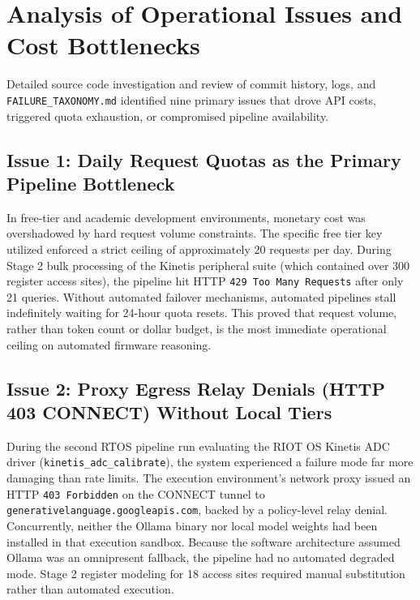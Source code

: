 \documentclass[11pt,a4paper]{article}
\begin{document}
\section{Analysis of Operational Issues and Cost Bottlenecks}

Detailed source code investigation and review of commit history, logs, and \texttt{FAILURE\_TAXONOMY.md} identified nine primary issues that drove API costs, triggered quota exhaustion, or compromised pipeline availability.

\subsection{Issue 1: Daily Request Quotas as the Primary Pipeline Bottleneck}
In free-tier and academic development environments, monetary cost was overshadowed by hard request volume constraints. The specific free tier key utilized enforced a strict ceiling of approximately 20 requests per day. During Stage 2 bulk processing of the Kinetis peripheral suite (which contained over 300 register access sites), the pipeline hit HTTP \texttt{429 Too Many Requests} after only 21 queries. Without automated failover mechanisms, automated pipelines stall indefinitely waiting for 24-hour quota resets. This proved that request volume, rather than token count or dollar budget, is the most immediate operational ceiling on automated firmware reasoning.

\subsection{Issue 2: Proxy Egress Relay Denials (HTTP 403 CONNECT) Without Local Tiers}
During the second RTOS pipeline run evaluating the RIOT OS Kinetis ADC driver (\texttt{kinetis\_adc\_calibrate}), the system experienced a failure mode far more damaging than rate limits. The execution environment's network proxy issued an HTTP \texttt{403 Forbidden} on the CONNECT tunnel to \texttt{generativelanguage.googleapis.com}, backed by a policy-level relay denial. Concurrently, neither the Ollama binary nor local model weights had been installed in that execution sandbox. Because the software architecture assumed Ollama was an omnipresent fallback, the pipeline had no automated degraded mode. Stage 2 register modeling for 18 access sites required manual substitution rather than automated execution.
\end{document}
